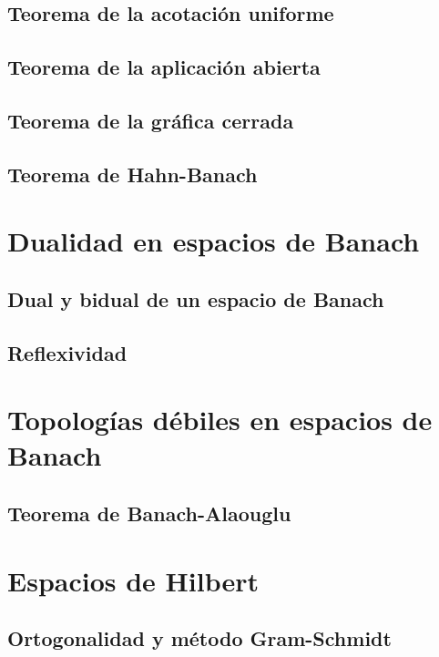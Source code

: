 \documentclass[bibnumbers, palatino]{apuntes}
\begin{document}
\section{Teorema de la acotación uniforme}

\section{Teorema de la aplicación abierta}

\section{Teorema de la gráfica cerrada}

\section{Teorema de Hahn-Banach}

\chapter{Dualidad en espacios de Banach}

\section{Dual y bidual de un espacio de Banach}

\section{Reflexividad}

\chapter{Topologías débiles en espacios de Banach}

\section{Teorema de Banach-Alaouglu}

\chapter{Espacios de Hilbert}

\section{Ortogonalidad y método Gram-Schmidt}
\end{document}
